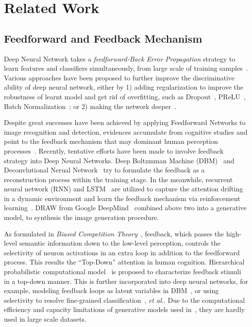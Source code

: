 \section{Related Work}
\label{sec:related_work}

\subsection{Feedforward and Feedback Mechanism}
Deep Neural Network takes a \emph{feedforward-Back Error Propagation} strategy to learn features and classifiers simultaneously, from large scale of training samples~\cite{Krizhevsky2012ImageNet,Simonyan2014Very,lin2013network,salakhutdinov2009deep,bengio2013representation}. Various approaches have been proposed to further improve the discriminative ability of deep neural network, either by 1) adding regularization to improve the robustness of learnt model and get rid of overfitting, such as Dropout~\cite{srivastava2014dropout}, PReLU~\cite{he2015delving}, Batch Normalization~\cite{ioffe2015batch}; or 2) making the network deeper~\cite{Szegedy2014Going,Simonyan2014Very}.

Despite great successes have been achieved by applying Feedforward Networks to image recognition and detection, evidences accumulate from cognitive studies and point to the feedback mechanism that may dominant human perception processes~\cite{Cichy2014Resolving,Rust:2010if,Kruger2013Deep,lee2003hierarchical}. Recently, tentative efforts have been made to involve feedback strategy into Deep Neural Networks. Deep Boltzmman Machine (DBM)~\cite{salakhutdinov2009deep} and Deconvlutional Nerual Network~\cite{Zeiler:2011hy} try to formulate the feedback as a reconstruction process within the training stage. In the meanwhile, recurrent neural network (RNN) and LSTM~\cite{hochreiter1997long} are utilized to capture the attention drifting in a dynamic environment and learn the feedback mechanism via reinforcement learning~\cite{Stollenga:2014tl,Mnih:2014ti}. DRAW from Google DeepMind~\cite{gregor2015draw} combined above two into a generative model, to synthesis the image generation procedure.

As formulated in \emph{Biased Competition Theory}~\cite{beck2009top,desimone1995neural}, feedback, which passes the high-level semantic information down to the low-level perception, controls the selectivity of neuron activations in an extra loop in addition to the feedforward process. This results the ``Top-Down'' attention in human cognition. Hierarchical probabilistic computational model~\cite{lee2003hierarchical} is proposed to characterize feedback stimuli in a top-down manner. This is further incorporated into deep neural networks, for example, modeling feedback loops as latent variables in DBM~\cite{wang2014attentional}, or using selectivity to resolve fine-grained classification~\cite{Mnih:2014ti}, \emph{et al.}. Due to the computational efficiency and capacity limitations of generative models used in~\cite{Mnih:2014ti,wang2014attentional}, they are hardly used in large scale datasets.

